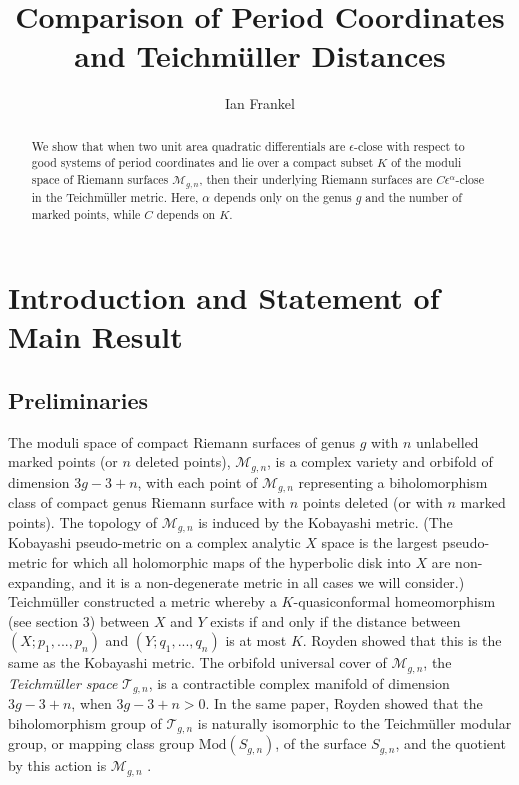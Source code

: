 \documentclass[12pt]{article}
\newcommand{\Mod}{\mathrm{Mod}}
\begin{document}
\pagestyle{plain}

\title{Comparison of Period Coordinates and Teichm\"uller Distances}
\author{Ian Frankel}

\maketitle

\begin{abstract}We show that when two unit area quadratic differentials are $\epsilon$-close with respect to good systems of period coordinates and lie over a compact subset $K$ of the moduli space of Riemann surfaces $\mathcal{M}_{g,n}$, then their underlying Riemann surfaces are $C\epsilon^{\alpha}$-close in the Teichm\"uller metric. Here, $\alpha$ depends only on the genus $g$ and the number of marked points, while $C$ depends on $K$.\end{abstract}

\tableofcontents

\section{Introduction and Statement of Main Result}

\subsection{Preliminaries}

\noindent The moduli space of compact Riemann surfaces of genus $g$ with $n$ unlabelled marked points (or $n$ deleted points), $\mathcal{M}_{g,n}$, is a complex variety and orbifold of dimension $3g - 3 + n$, with each point of $\mathcal{M}_{g,n}$ representing a biholomorphism class of compact genus Riemann surface with $n$ points deleted (or with $n$ marked points). The topology of $\mathcal{M}_{g,n}$ is induced by the Kobayashi metric. (The Kobayashi pseudo-metric on a complex analytic  $X$ space is the largest pseudo-metric for which all holomorphic maps of the hyperbolic disk into $X$ are non-expanding, and it is a non-degenerate metric in all cases we will consider.) Teichm\"uller constructed a metric whereby a $K$-quasiconformal homeomorphism (see section 3) between $X$ and $Y$ exists if and only if the distance between $(X;p_1,...,p_n)$ and $(Y;q_1,...,q_n)$ is at most $K$. Royden showed that this is the same as the Kobayashi metric. The orbifold universal cover of $\mathcal{M}_{g,n}$, the \emph{Teichm\"uller space} $\mathcal{T}_{g,n}$, is a contractible complex manifold of dimension $3g-3+n$, when $3g-3+n > 0$. In the same paper, Royden showed that the biholomorphism group of $\mathcal{T}_{g,n}$ is naturally isomorphic to the Teichm\"uller modular group, or mapping class group $\Mod(S_{g,n})$, of the surface $S_{g,n}$, and the quotient by this action is $\mathcal{M}_{g,n}$ \cite{Royden}.\\
\end{document}
